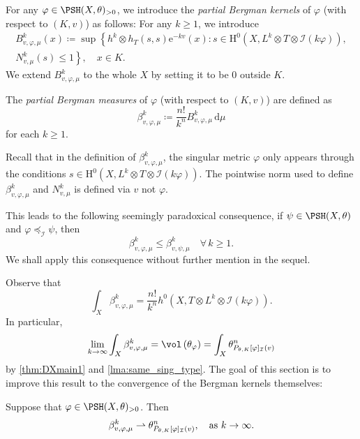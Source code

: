 \begin{definition}\label{def:Bergman:L778}
    For any $\varphi\in \PSH(X,\theta)_{>0}$, we introduce the \emph{partial Bergman kernels} of $\varphi$ (with respect to $(K,v)$) as follows: For any $k\geq 1$, we introduce
    \begin{equation}
    \begin{aligned}
     B^k_{v,\varphi, \mu}(x) \coloneqq \sup \left\{h^k \otimes h_T(s,s)\mathrm{e}^{-kv}(x):s \in \mathrm{H}^0\left(X,L^k \otimes T \otimes \mathcal{I}(k\varphi)\right),\right.\\
     \left. N^k_{v,\mu}(s) \leq 1 \right\},\quad x\in K.
     \end{aligned}
 \end{equation}
 We extend $B^k_{v,\varphi, \mu}$ to the whole $X$ by setting it to be $0$ outside $K$.

 The \emph{partial Bergman measures} of $\varphi$ (with respect to $(K,v)$) are defined as
 \begin{equation}
\beta^k_{v,\varphi,\mu} \coloneqq \frac{n!}{k^n} B^k_{v,\varphi,\mu} \,\mathrm{d}\mu
\end{equation}
for each $k\geq 1$.
\end{definition}

\begin{remark}\label{rmk:Bergman:L797}
    Recall that in the definition of $\beta^k_{v,\varphi,\mu}$, the singular metric $\varphi$ only appears through the conditions $s \in \mathrm{H}^0(X,L^k \otimes T \otimes \mathcal{I}(k\varphi))$. The pointwise norm used to define $\beta^k_{v,\varphi,\mu}$ and $N^k_{v,\mu}$ is defined via $v$ not $\varphi$.

    This leads to the following seemingly paradoxical consequence, if $\psi\in \PSH(X,\theta)$ and $\varphi\preceq_{\mathcal{I}}\psi$, then
    \[
        \beta^k_{v,\varphi,\mu}\leq \beta^k_{v,\psi,\mu}\quad \forall\,k\geq 1.
    \]
    We shall apply this consequence without further mention in the sequel.
\end{remark}


Observe that
\[
    \int_X \beta^k_{v,\varphi,\mu}=\frac{n!}{k^n}h^0\left(X,T\otimes L^k \otimes \mathcal{I}(k\varphi)\right).
\]
In particular,
\begin{equation}\label{eq:betaint_conv}
    \lim_{k\to\infty}\int_X \beta^k_{v,\varphi,\mu}=\vol\left(\theta_{\varphi}\right)=\int_X \theta_{P_{\theta,K}[\varphi]_{\mathcal{I}}(v)}^n
\end{equation}
by \cref{thm:DXmain1} and \cref{lma:same_sing_type}. The goal of this section is to improve this result to the convergence of the Bergman kernels themselves:
\begin{theorem}\label{thm:pBMconvergence} Suppose that $\varphi \in \PSH(X,\theta)_{>0}$. Then
\begin{equation}\label{eq:pbkconvgeneral}
\beta^k_{v,\varphi,\mu} \rightharpoonup \theta_{P_{\theta,K}[\varphi]_{\mathcal{I}}(v)}^n,\quad \textup{as }k\to\infty.
\end{equation}
\end{theorem}

